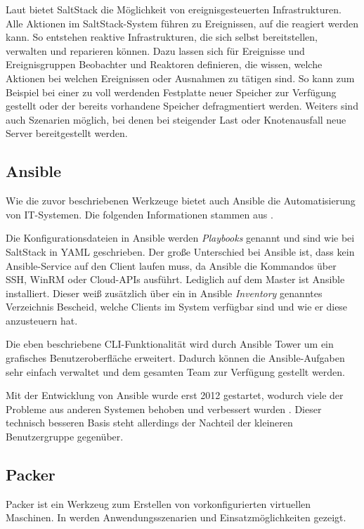 Laut \autocite{SaltStack-Event:online} bietet SaltStack die Möglichkeit von ereignisgesteuerten Infrastrukturen.
Alle Aktionen im SaltStack-System führen zu Ereignissen, auf die reagiert werden kann.
So entstehen reaktive Infrastrukturen, die sich selbst bereitstellen, verwalten und reparieren können.
Dazu lassen sich für Ereignisse und Ereignisgruppen Beobachter und Reaktoren definieren, die wissen, welche Aktionen bei welchen Ereignissen oder Ausnahmen zu tätigen sind.
So kann zum Beispiel bei einer zu voll werdenden Festplatte neuer Speicher zur Verfügung gestellt oder der bereits vorhandene Speicher defragmentiert werden.
Weiters sind auch Szenarien möglich, bei denen bei steigender Last oder Knotenausfall neue Server bereitgestellt werden.

\subsection{Ansible}
\label{sub:ansible}
Wie die zuvor beschriebenen Werkzeuge bietet auch Ansible die Automatisierung von IT-Systemen.
Die folgenden Informationen stammen aus \autocite{Ansible:online}.

Die Konfigurationsdateien in Ansible werden \emph{Playbooks} genannt und sind wie bei SaltStack in YAML geschrieben.
Der große Unterschied bei Ansible ist, dass kein Ansible-Service auf den Client laufen muss, da Ansible die Kommandos über SSH, WinRM oder Cloud-APIs ausführt.
Lediglich auf dem Master ist Ansible installiert.
Dieser weiß zusätzlich über ein in Ansible \emph{Inventory} genanntes Verzeichnis Bescheid, welche Clients im System verfügbar sind und wie er diese anzusteuern hat.

Die eben beschriebene CLI-Funktionalität wird durch Ansible Tower um ein grafisches Benutzeroberfläche erweitert.
Dadurch können die Ansible-Aufgaben sehr einfach verwaltet und dem gesamten Team zur Verfügung gestellt werden.

Mit der Entwicklung von Ansible wurde erst 2012 gestartet, wodurch viele der Probleme aus anderen Systemen behoben und verbessert wurden \autocite{Wolff201604}. Dieser technisch besseren Basis steht allerdings der Nachteil der kleineren Benutzergruppe gegenüber.

\subsection{Packer}
\label{sub:packer}
Packer ist ein Werkzeug zum Erstellen von vorkonfigurierten virtuellen Maschinen.
In \autocite{Packer:online} werden Anwendungsszenarien und Einsatzmöglichkeiten gezeigt.

